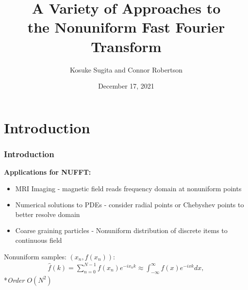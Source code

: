 \documentclass{beamer}
\title{
  A Variety of Approaches to \\
  the Nonuniform Fast Fourier Transform
}
\author{Kosuke Sugita and Connor Robertson}
\date{December 17, 2021}
\begin{document}
\frame{\titlepage}

\section{Introduction}
\begin{frame}
    \frametitle{Introduction}
    \textbf{Applications for NUFFT:}
    \begin{itemize}
        \item MRI Imaging - magnetic field reads frequency domain at nonuniform points
        \item Numerical solutions to PDEs - consider radial points or Chebyshev points to better resolve domain
        \item Coarse graining particles - Nonuniform distribution of discrete items to continuous field
    \end{itemize}

    \vfill

    Nonuniform samples: $(x_n, f(x_n))$:
    \begin{align*}
        \hat{f}(k) = \sum_{n=0}^{N-1} f(x_n) e^{-i x_n k} \approx \int_{-\infty}^{\infty} f(x) e^{-i x k}dx
    ,\end{align*}
    *\textit{Order $O(N^{2})$}
\end{frame}
\end{document}
